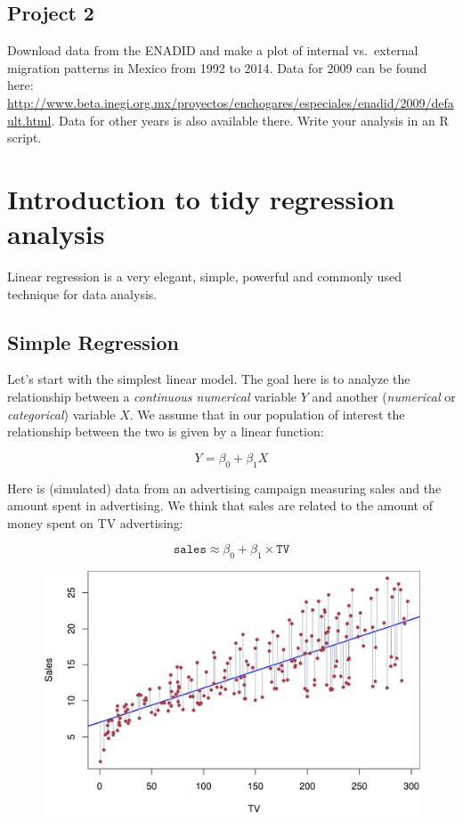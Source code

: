 \documentclass[12pt,]{book}
\theoremstyle{definition}
\theoremstyle{definition}
\theoremstyle{remark}
\begin{document}
\section{Project 2}\label{project-2}

Download data from the ENADID and make a plot of internal vs.~external
migration patterns in Mexico from 1992 to 2014. Data for 2009 can be
found here:
\url{http://www.beta.inegi.org.mx/proyectos/enchogares/especiales/enadid/2009/default.html}.
Data for other years is also available there. Write your analysis in an
R script.

\chapter{Introduction to tidy regression
analysis}\label{introduction-to-tidy-regression-analysis}

Linear regression is a very elegant, simple, powerful and commonly used
technique for data analysis.

\section{Simple Regression}\label{simple-regression}

Let's start with the simplest linear model. The goal here is to analyze
the relationship between a \emph{continuous numerical} variable \(Y\)
and another (\emph{numerical} or \emph{categorical}) variable \(X\). We
assume that in our population of interest the relationship between the
two is given by a linear function:

\[
Y = \beta_0 + \beta_1 X
\]

Here is (simulated) data from an advertising campaign measuring sales
and the amount spent in advertising. We think that sales are related to
the amount of money spent on TV advertising:

\[
\mathtt{sales} \approx \beta_0 + \beta_1 \times \mathtt{TV}
\]

\begin{figure}
\centering
\includegraphics{img/regression_example.png}
\caption{}
\end{figure}
\end{document}
